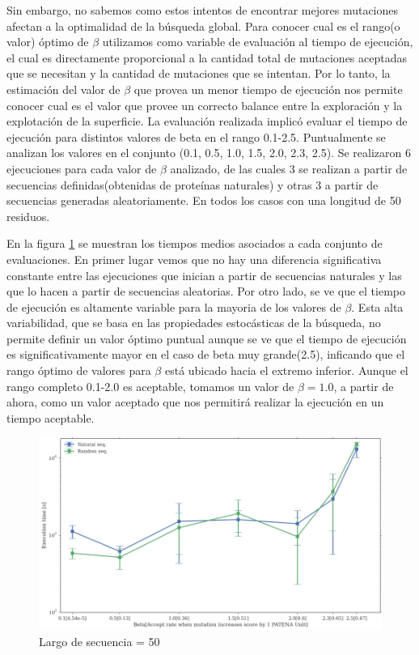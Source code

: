 Sin embargo, no sabemos como estos intentos de encontrar mejores mutaciones afectan a la optimalidad de la búsqueda global.
Para conocer cual es el rango(o valor) óptimo de $\beta$ utilizamos como variable de evaluación al tiempo de ejecución, 
el cual es directamente proporcional a la cantidad total de mutaciones aceptadas que se necesitan y la cantidad de mutaciones que se intentan.
Por lo tanto, la estimación del valor de $\beta$ que provea un menor tiempo de ejecución nos permite conocer cual es el valor que provee un correcto balance entre la exploración y la explotación de la superficie.
La evaluación realizada implicó evaluar el tiempo de ejecución para distintos valores de beta en el rango 0.1-2.5.
Puntualmente se analizan los valores en el conjunto (0.1, 0.5, 1.0, 1.5, 2.0, 2.3, 2.5). 
Se realizaron 6 ejecuciones para cada valor de $\beta$ analizado, de las cuales 3 se realizan a partir de secuencias definidas(obtenidas de proteínas naturales) y otras 3 a partir de secuencias generadas aleatoriamente.
En todos los casos con una longitud de 50 residuos.

En la figura \ref{fig:beta-vs-time} se muestran los tiempos medios asociados a cada conjunto de evaluaciones.
En primer lugar vemos que no hay una diferencia significativa constante entre las ejecuciones que inician a partir de secuencias naturales y las que lo hacen a partir de secuencias aleatorias.
Por otro lado, se ve que el tiempo de ejecución es altamente variable para la mayoria de los valores de $\beta$.
Esta alta variabilidad, que se basa en las propiedades estocásticas de la búsqueda, no permite definir un valor óptimo puntual aunque se ve que el tiempo de ejecución es significativamente mayor en el caso de beta muy grande(2.5), 
inficando que el rango óptimo de valores para $\beta$ está ubicado hacia el extremo inferior.
Aunque el rango completo 0.1-2.0 es aceptable, tomamos un valor de $\beta=1.0$, a partir de ahora, como un valor aceptado que nos permitirá realizar la ejecución en un tiempo aceptable.



\begin{figure}[htbp]
\advance\leftskip-1.2cm
\includegraphics[width=1.1\textwidth]{img/resultados/beta-vs-time-length50-rate.png}
\caption{Largo de secuencia = 50}
\label{fig:beta-vs-time}
\end{figure}



